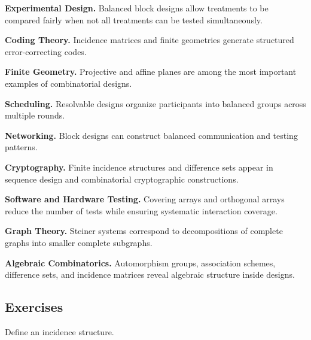 \begin{applicationbox}

\textbf{Experimental Design.}
Balanced block designs allow treatments to be compared fairly when not
all treatments can be tested simultaneously.

\medskip

\textbf{Coding Theory.}
Incidence matrices and finite geometries generate structured
error-correcting codes.

\medskip

\textbf{Finite Geometry.}
Projective and affine planes are among the most important examples of
combinatorial designs.

\medskip

\textbf{Scheduling.}
Resolvable designs organize participants into balanced groups across
multiple rounds.

\medskip

\textbf{Networking.}
Block designs can construct balanced communication and testing
patterns.

\medskip

\textbf{Cryptography.}
Finite incidence structures and difference sets appear in sequence
design and combinatorial cryptographic constructions.

\medskip

\textbf{Software and Hardware Testing.}
Covering arrays and orthogonal arrays reduce the number of tests while
ensuring systematic interaction coverage.

\medskip

\textbf{Graph Theory.}
Steiner systems correspond to decompositions of complete graphs into
smaller complete subgraphs.

\medskip

\textbf{Algebraic Combinatorics.}
Automorphism groups, association schemes, difference sets, and
incidence matrices reveal algebraic structure inside designs.

\end{applicationbox}

\subsection{Exercises}
\label{subsec:design-theory-exercises}

\begin{exercise}[1]
Define an incidence structure.
\end{exercise}

